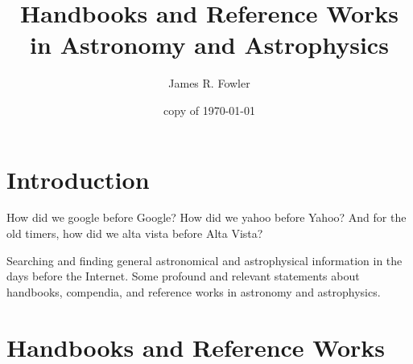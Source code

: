 \documentclass{article}
\begin{document}
\title{Handbooks and Reference Works in Astronomy and Astrophysics}
\author{James R. Fowler}
\date{copy of \today}

\maketitle

\tableofcontents

\section{Introduction}

How did we google before Google\texttrademark? How did we yahoo
before Yahoo\texttrademark? And for the old timers, how did we alta
vista before Alta Vista\texttrademark?

Searching and finding general astronomical and astrophysical
information in the days before the Internet. Some profound and
relevant statements about handbooks, compendia, and reference works in
 astronomy and astrophysics.

\section{Handbooks and Reference Works}
\end{document}
